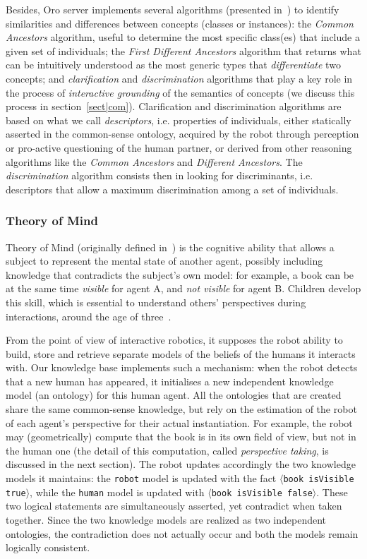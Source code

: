 \documentclass[preprint,3p,times]{elsarticle}
\newcommand{\concept}[1]{{\small \texttt{#1}}}
\newcommand{\stmt}[1]{{\footnotesize\tt$\langle$#1\relax$\rangle$}}
\newcommand{\ie}{i.e.\xspace}
\begin{document}
Besides, {\sc Oro} server implements several algorithms (presented
in~\cite{Ros2010b}) to identify
similarities and differences between concepts (classes or
instances): the \emph{Common Ancestors} algorithm, useful to
determine the most specific class(es) that include a given set of individuals;
the \emph{First Different Ancestors} algorithm that returns what can be
intuitively understood as the most generic types that \emph{differentiate} two
concepts; and \emph{clarification} and \emph{discrimination} algorithms that
play a key role in the process of \emph{interactive grounding} of the semantics
of concepts (we discuss this process in section~\ref{sect|com}). Clarification
and discrimination algorithms are based on what we call \emph{descriptors}, \ie
properties of individuals, either statically asserted in the common-sense
ontology, acquired by the robot through perception or pro-active questioning of
the human partner, or derived from other reasoning algorithms like the
\emph{Common Ancestors} and \emph{Different Ancestors}. The
\emph{discrimination} algorithm consists then in looking for discriminants, \ie
descriptors that allow a maximum discrimination among a set of individuals.

\subsubsection{Theory of Mind}
\label{sect|tom}

Theory of Mind (originally defined in~\cite{Premack1978}) is the cognitive
ability that allows a subject to represent the mental state of another
agent, possibly including knowledge that contradicts the subject's own model: for
example, a book can be at the same time \emph{visible} for agent A, and \emph{not
visible} for agent B. Children develop this skill, which is essential to understand others' perspectives during
interactions, around the age of three~\cite{perner2012infants}. 

From the point of view of interactive robotics, it supposes the robot ability to
build, store and retrieve separate models of the beliefs of the humans it
interacts with.  Our knowledge base implements such a mechanism: when the robot
detects that a new human has appeared, it initialises a new independent
knowledge model (an ontology) for this human agent. All the ontologies that are
created share the same common-sense knowledge, but rely on the estimation of the
robot of each agent's perspective for their actual instantiation. For example,
the robot may (geometrically) compute that the book is in its own field of view,
but not in the human one (the detail of this computation, called
\emph{perspective taking}, is discussed in the next section). The robot updates
accordingly the two knowledge models it maintains: the \concept{robot} model is
updated with the fact \stmt{book isVisible true}, while the \concept{human}
model is updated with \stmt{book isVisible false}. These two logical statements
are simultaneously asserted, yet contradict when taken together. Since the two
knowledge models are realized as two independent ontologies, the contradiction
does not actually occur and both the models remain logically consistent.
\end{document}
